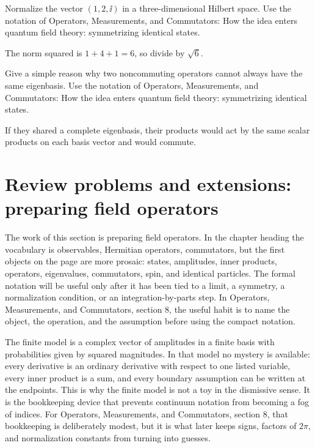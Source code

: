 \begin{exercise}
Normalize the vector \((1,2,\ii)\) in a three-dimensional Hilbert space.  Use the notation of Operators, Measurements, and Commutators: How the idea enters quantum field theory: symmetrizing identical states.
\begin{answer}
The norm squared is \(1+4+1=6\), so divide by \(\sqrt6\).
\end{answer}
\end{exercise}

\begin{exercise}
Give a simple reason why two noncommuting operators cannot always have the same eigenbasis.  Use the notation of Operators, Measurements, and Commutators: How the idea enters quantum field theory: symmetrizing identical states.
\begin{answer}
If they shared a complete eigenbasis, their products would act by the same scalar products on each basis vector and would commute.
\end{answer}
\end{exercise}



\section{Review problems and extensions: preparing field operators}

The work of this section is preparing field operators.  In the chapter heading the vocabulary is observables, Hermitian operators, commutators, but the first objects on the page are more prosaic: states, amplitudes, inner products, operators, eigenvalues, commutators, spin, and identical particles.  The formal notation will be useful only after it has been tied to a limit, a symmetry, a normalization condition, or an integration-by-parts step.  In Operators, Measurements, and Commutators, section 8, the useful habit is to name the object, the operation, and the assumption before using the compact notation.

The finite model is a complex vector of amplitudes in a finite basis with probabilities given by squared magnitudes.  In that model no mystery is available: every derivative is an ordinary derivative with respect to one listed variable, every inner product is a sum, and every boundary assumption can be written at the endpoints.  This is why the finite model is not a toy in the dismissive sense.  It is the bookkeeping device that prevents continuum notation from becoming a fog of indices.  For Operators, Measurements, and Commutators, section 8, that bookkeeping is deliberately modest, but it is what later keeps signs, factors of \(2\pi\), and normalization constants from turning into guesses.

